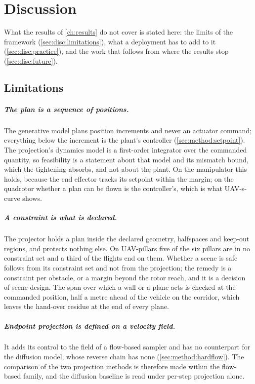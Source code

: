 \chapter{Discussion}\label{ch:discussion}

What the results of \autoref{ch:results} do not cover is stated here: the limits of the framework
(\autoref{sec:disc:limitations}), what a deployment has to add to it (\autoref{sec:disc:practice}),
and the work that follows from where the results stop (\autoref{sec:disc:future}).

\section{Limitations}\label{sec:disc:limitations}

\paragraph{The plan is a sequence of positions.} The generative model plans position increments and
never an actuator command; everything below the increment is the plant's controller
(\autoref{sec:method:setpoint}). The projection's dynamics model is a first-order integrator over the
commanded quantity, so feasibility is a statement about that model and its mismatch bound, which the
tightening absorbs, and not about the plant. On the manipulator this holds, because the end effector
tracks its setpoint within the margin; on the quadrotor whether a plan can be flown is the
controller's, which is what UAV-s-curve shows.

\paragraph{A constraint is what is declared.} The projector holds a plan inside the declared geometry,
halfspaces and keep-out regions, and protects nothing else. On UAV-pillars five of the six pillars are
in no constraint set and a third of the flights end on them. Whether a scene is safe follows from its
constraint set and not from the projection; the remedy is a constraint per obstacle, or a margin beyond
the rotor reach, and it is a decision of scene design. The span over which a wall or a plane acts is
checked at the commanded position, half a metre ahead of the vehicle on the corridor, which leaves the
hand-over residue at the end of every plane.

\paragraph{Endpoint projection is defined on a velocity field.} It adds its control to the field of a
flow-based sampler and has no counterpart for the diffusion model, whose reverse chain has none
(\autoref{sec:method:hardflow}). The comparison of the two projection methods is therefore made within
the flow-based family, and the diffusion baseline is read under per-step projection alone.

